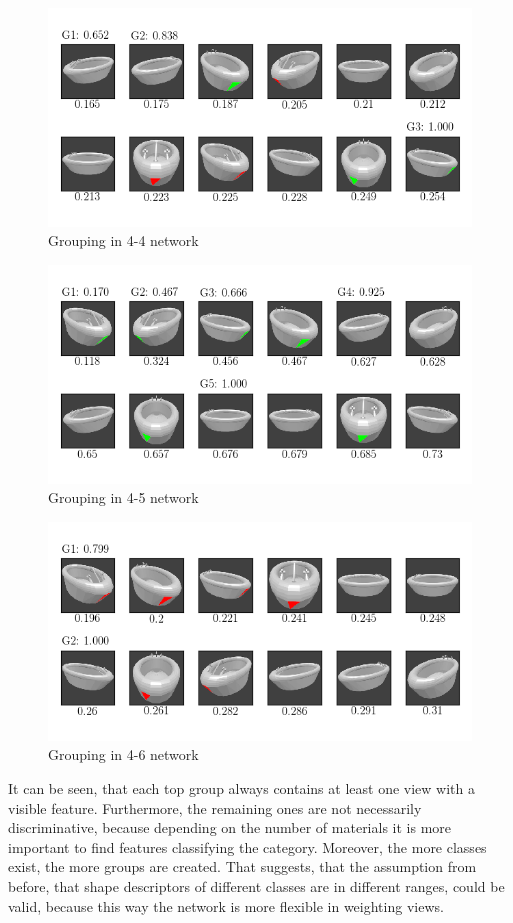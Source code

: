 \begin{figure}
	\centering
	\includegraphics[trim=10 20 10 20, clip]{images/mn-sl-4-4-20/bathtub_0107_3_grouping.png}
	\caption{Grouping in 4-4 network}
	\label{fig:grouping-4-4}
\end{figure}
\begin{figure}
	\centering
	\includegraphics[trim=10 20 10 20, clip]{images/mn-sl-4-5-20/bathtub_0107_4_grouping.png}
	\caption{Grouping in 4-5 network}
	\label{fig:grouping-4-5}
\end{figure}
\begin{figure}
	\centering
	\includegraphics[trim=10 20 10 20, clip]{images/mn-sl-4-6-20/bathtub_0107_5_grouping.png}
	\caption{Grouping in 4-6 network}
	\label{fig:grouping-4-6}
\end{figure}
It can be seen, that each top group always contains at least one view with a visible feature.
Furthermore, the remaining ones are not necessarily discriminative, because depending on the number of materials it is more important to find features classifying the category.
Moreover, the more classes exist, the more groups are created.
That suggests, that the assumption from before, that shape descriptors of different classes are in different ranges, could be valid, because this way the network is more flexible in weighting views.